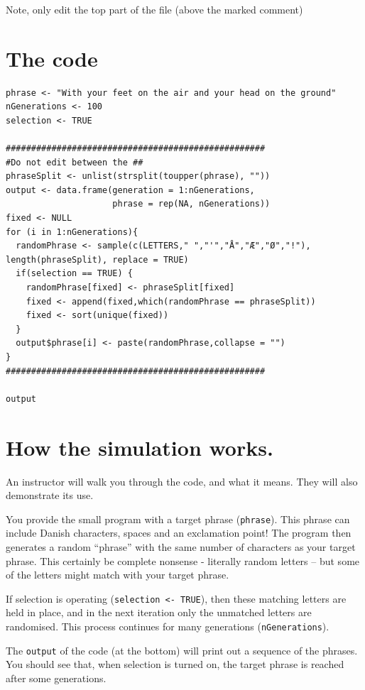 \documentclass[
  a4paper]{book}
\begin{document}
Note, only edit the top part of the file (above the marked comment)

\hypertarget{the-code}{%
\section{The code}\label{the-code}}

\begin{verbatim}
phrase <- "With your feet on the air and your head on the ground"
nGenerations <- 100
selection <- TRUE

###################################################
#Do not edit between the ##
phraseSplit <- unlist(strsplit(toupper(phrase), ""))
output <- data.frame(generation = 1:nGenerations, 
                     phrase = rep(NA, nGenerations))
fixed <- NULL
for (i in 1:nGenerations){
  randomPhrase <- sample(c(LETTERS," ","'","Å","Æ","Ø","!"), length(phraseSplit), replace = TRUE)
  if(selection == TRUE) {
    randomPhrase[fixed] <- phraseSplit[fixed]
    fixed <- append(fixed,which(randomPhrase == phraseSplit))
    fixed <- sort(unique(fixed))
  }
  output$phrase[i] <- paste(randomPhrase,collapse = "")
}
###################################################

output
\end{verbatim}

\hypertarget{how-the-simulation-works.}{%
\section{How the simulation works.}\label{how-the-simulation-works.}}

An instructor will walk you through the code, and what it means. They will also demonstrate its use.

You provide the small program with a target phrase (\texttt{phrase}). This phrase can include Danish characters, spaces and an exclamation point!
The program then generates a random ``phrase'' with the same number of characters as your target phrase. This certainly be complete nonsense - literally random letters -- but some of the letters might match with your target phrase.

If selection is operating (\texttt{selection\ \textless{}-\ TRUE}), then these matching letters are held in place, and in the next iteration only the unmatched letters are randomised. This process continues for many generations (\texttt{nGenerations}).

The \texttt{output} of the code (at the bottom) will print out a sequence of the phrases. You should see that, when selection is turned on, the target phrase is reached after some generations.
\end{document}
